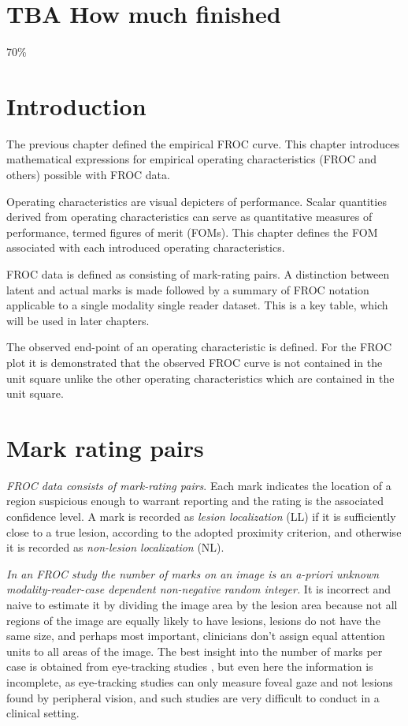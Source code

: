 \documentclass[
]{book}
\begin{document}
\hypertarget{froc-empirical-how-much-finished}{%
\section{TBA How much finished}\label{froc-empirical-how-much-finished}}

70\%

\hypertarget{froc-empirical-intro}{%
\section{Introduction}\label{froc-empirical-intro}}

The previous chapter defined the empirical FROC curve. This chapter introduces mathematical expressions for empirical operating characteristics (FROC and others) possible with FROC data.

Operating characteristics are visual depicters of performance. Scalar quantities derived from operating characteristics can serve as quantitative measures of performance, termed figures of merit (FOMs). This chapter defines the FOM associated with each introduced operating characteristics.

FROC data is defined as consisting of mark-rating pairs. A distinction between latent and actual marks is made followed by a summary of FROC notation applicable to a single modality single reader dataset. This is a key table, which will be used in later chapters.

The observed end-point of an operating characteristic is defined. For the FROC plot it is demonstrated that the observed FROC curve is not contained in the unit square unlike the other operating characteristics which are contained in the unit square.

\hypertarget{froc-empirical-mark-rating-pairs}{%
\section{Mark rating pairs}\label{froc-empirical-mark-rating-pairs}}

\emph{FROC data consists of mark-rating pairs}. Each mark indicates the location of a region suspicious enough to warrant reporting and the rating is the associated confidence level. A mark is recorded as \emph{lesion localization} (LL) if it is sufficiently close to a true lesion, according to the adopted proximity criterion, and otherwise it is recorded as \emph{non-lesion localization} (NL).

\emph{In an FROC study the number of marks on an image is an a-priori unknown modality-reader-case dependent non-negative random integer.} It is incorrect and naive to estimate it by dividing the image area by the lesion area because not all regions of the image are equally likely to have lesions, lesions do not have the same size, and perhaps most important, clinicians don't assign equal attention units to all areas of the image. The best insight into the number of marks per case is obtained from eye-tracking studies \citep{RN1490}, but even here the information is incomplete, as eye-tracking studies can only measure foveal gaze and not lesions found by peripheral vision, and such studies are very difficult to conduct in a clinical setting.
\end{document}
